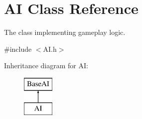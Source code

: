 \hypertarget{classAI}{
\section{AI Class Reference}
\label{classAI}
}


The class implementing gameplay logic.  




{\ttfamily \#include $<$AI.h$>$}

Inheritance diagram for AI:\begin{figure}[H]
\begin{center}
\leavevmode
\includegraphics[height=2cm]{classAI}
\end{center}
\end{figure}
